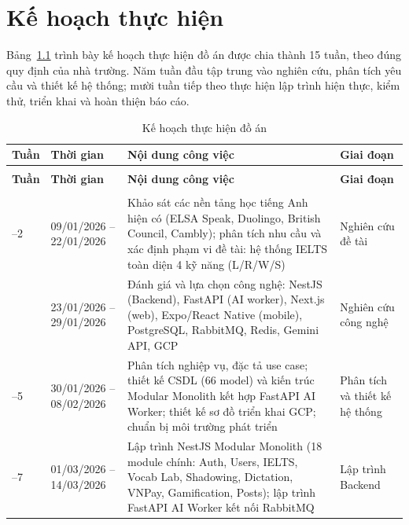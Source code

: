 \chapter{Kế hoạch thực hiện}
\thispagestyle{appendixstyle}
\label{app:kehoach}

Bảng~\ref{tab:kehoach} trình bày kế hoạch thực hiện đồ án được chia thành 15 tuần, theo đúng quy định của nhà trường. Năm tuần đầu tập trung vào nghiên cứu, phân tích yêu cầu và thiết kế hệ thống; mười tuần tiếp theo thực hiện lập trình hiện thực, kiểm thử, triển khai và hoàn thiện báo cáo.

\setlength{\tbu}{\dimexpr(\linewidth - 8\tabcolsep - 5\arrayrulewidth)/145\relax}
{\footnotesize
\renewcommand{\arraystretch}{0.95}
\begin{longtable}{|>{\centering\arraybackslash}p{15\tbu}|p{28\tbu}|p{62\tbu}|p{40\tbu}|}
    \caption{Kế hoạch thực hiện đồ án} \label{tab:kehoach} \\
    \hline
    \textbf{Tuần} & \textbf{Thời gian} & \textbf{Nội dung công việc} & \textbf{Giai đoạn} \\ \hline
    \endfirsthead
    \multicolumn{4}{r}{\footnotesize\textit{(tiếp theo)}} \\
    \hline
    \textbf{Tuần} & \textbf{Thời gian} & \textbf{Nội dung công việc} & \textbf{Giai đoạn} \\ \hline
    \endhead
    \hline \multicolumn{4}{r}{\footnotesize\textit{(còn tiếp)}} \\
    \endfoot
    \endlastfoot
    1--2 & 09/01/2026 -- 22/01/2026 & Khảo sát các nền tảng học tiếng Anh hiện có (ELSA Speak, Duolingo, British Council, Cambly); phân tích nhu cầu và xác định phạm vi đề tài: hệ thống IELTS toàn diện 4 kỹ năng (L/R/W/S) & Nghiên cứu đề tài \\ \hline
    3 & 23/01/2026 -- 29/01/2026 & Đánh giá và lựa chọn công nghệ: NestJS (Backend), FastAPI (AI worker), Next.js (web), Expo/React Native (mobile), PostgreSQL, RabbitMQ, Redis, Gemini API, GCP & Nghiên cứu công nghệ \\ \hline
    4--5 & 30/01/2026 -- 08/02/2026 & Phân tích nghiệp vụ, đặc tả use case; thiết kế CSDL (66 model) và kiến trúc Modular Monolith kết hợp FastAPI AI Worker; thiết kế sơ đồ triển khai GCP; chuẩn bị môi trường phát triển & Phân tích và thiết kế hệ thống \\ \hline
    6--7 & 01/03/2026 -- 14/03/2026 & Lập trình NestJS Modular Monolith (18 module chính: Auth, Users, IELTS, Vocab Lab, Shadowing, Dictation, VNPay, Gamification, Posts); lập trình FastAPI AI Worker kết nối RabbitMQ & Lập trình Backend \\ \hline

\end{longtable}}
